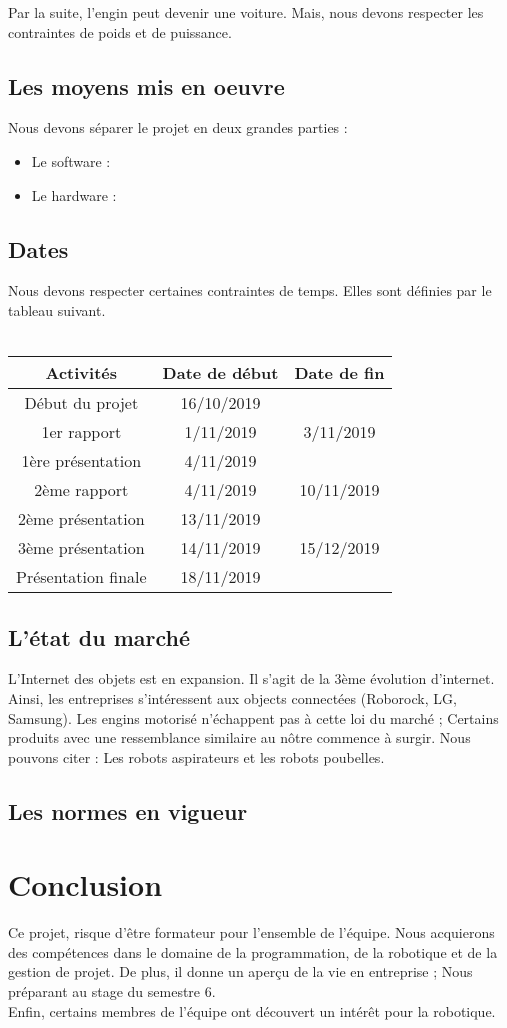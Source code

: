 \documentclass[conference]{IEEEtran}
\begin{document}
Par la suite, l'engin peut devenir une voiture. Mais, nous devons respecter les contraintes de poids et de puissance.
\subsection{Les moyens mis en oeuvre}
Nous devons séparer le projet en deux grandes parties :
\begin{itemize}
    \item Le software :
    \item Le hardware :
\end{itemize}

\subsection{Dates}
Nous devons respecter certaines contraintes de temps. Elles sont définies par le tableau suivant.
\\ \\
\begin{tabular}{|*{3}{c|}}
  \hline
  Activités & Date de début & Date de fin \\
  \hline
  Début du projet & 16/10/2019 &  \\
  1er rapport & 1/11/2019 & 3/11/2019 \\
  1ère présentation & 4/11/2019 &   \\
  2ème rapport & 4/11/2019 & 10/11/2019  \\
  2ème présentation & 13/11/2019 &   \\
  3ème présentation & 14/11/2019 & 15/12/2019  \\
  Présentation finale & 18/11/2019 &  \\
  \hline
\end{tabular}

\subsection{L'état du marché}
L'Internet des objets est en expansion. Il s'agit de la 3ème évolution d'internet. Ainsi, les entreprises s'intéressent aux objects connectées (Roborock, LG, Samsung). Les engins motorisé n'échappent pas à cette loi du marché ; Certains produits avec une ressemblance similaire au nôtre commence à surgir. Nous pouvons citer : Les robots aspirateurs et les robots poubelles. 

\subsection{Les normes en vigueur}

\section{Conclusion}
Ce projet, risque d'être formateur pour l'ensemble de l'équipe. Nous acquierons des compétences dans le domaine de la programmation, de la robotique et de la gestion de projet. De plus, il donne un aperçu de la vie en entreprise ; Nous préparant au stage du semestre 6.\\
	Enfin, certains membres de l'équipe ont découvert un intérêt pour la robotique. 
\end{document}
